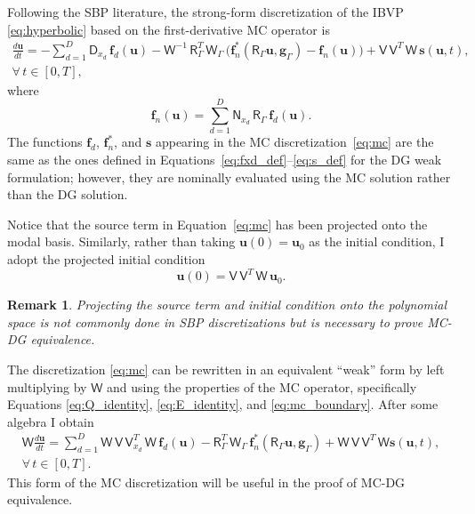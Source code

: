 \documentclass[pdflatex,sn-mathphys-num]{sn-jnl}%
\theoremstyle{thmstyleone}%
\theoremstyle{thmstyletwo}%
\newtheorem{remark}{Remark}%
\theoremstyle{thmstylethree}%
\newcommand{\mat}[1]{\ensuremath{\mathsf{#1}}}
\begin{document}
Following the SBP literature, the strong-form discretization of the IBVP \eqref{eq:hyperbolic} based on the first-derivative MC operator is
\begin{multline}\label{eq:mc}
    \frac{d \bm{u}}{dt} = - \sum_{d=1}^{D} \mat{D}_{x_d} \, \bm{f}_{d}(\bm{u}) -\mat{W}^{-1}\, \mat{R}_{\Gamma}^T \, \mat{W}_{\Gamma} \, \big( \bm{f}_n^*(\mat{R}_\Gamma \bm{u}, \bm{g}_{\Gamma}) - \bm{f}_{n}(\bm{u}) \big) + \mat{V}\, \mat{V}^T\, \mat{W} \, \bm{s}(\bm{u},t), \\ \forall\, t \in [0,T],
\end{multline}
where 
\begin{equation}\label{eq:fn}
\bm{f}_n(\bm{u}) = \sum_{d=1}^D \mat{N}_{x_d}\,\mat{R}_\Gamma\, \bm{f}_{d}(\bm{u}).
\end{equation}
The functions $\bm{f}_{d}$, $\bm{f}_n^*$, and $\bm{s}$ appearing in the MC discretization~\eqref{eq:mc} are the same as the ones defined in Equations~\eqref{eq:fxd_def}--\eqref{eq:s_def} for the DG weak formulation; however, they are nominally evaluated using the MC solution rather than the DG solution.

Notice that the source term in Equation~\eqref{eq:mc} has been projected onto the modal basis.  Similarly, rather than taking $\bm{u}(0) = \bm{u}_0$ as the initial condition, I adopt the projected initial condition 
\begin{equation}\label{eq:mc_ic}
    \bm{u}(0) = \mat{V}\, \mat{V}^T \, \mat{W}\, \bm{u}_0.
\end{equation}

\begin{remark}
Projecting the source term and initial condition onto the polynomial space is not commonly done in SBP discretizations but is necessary to prove MC-DG equivalence.
\end{remark}

The discretization \eqref{eq:mc} can be rewritten in an equivalent ``weak'' form by left multiplying by $\mat{W}$ and using the properties of the MC operator, specifically Equations \eqref{eq:Q_identity}, \eqref{eq:E_identity}, and \eqref{eq:mc_boundary}.  After some algebra I obtain 
\begin{multline}\label{eq:mc_weak}
    \mat{W} \frac{d \bm{u}}{dt} = \sum_{d=1}^D \mat{W} \,\mat{V} \, \mat{V}_{x_d}^T \, \mat{W} \, \bm{f}_{d}(\bm{u}) - \mat{R}_\Gamma^T \, \mat{W}_\Gamma \, \bm{f}_n^*(\mat{R}_\Gamma \bm{u}, \bm{g}_\Gamma) + \mat{W} \, \mat{V} \, \mat{V}^T \, \mat{W} \bm{s}(\bm{u},t),\\
    \forall\, t\in[0,T].
\end{multline}
This form of the MC discretization will be useful in the proof of MC-DG equivalence. 
\end{document}
